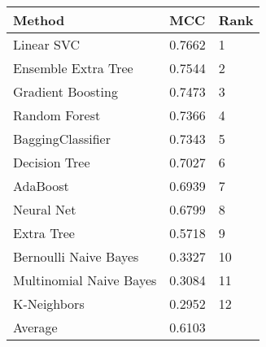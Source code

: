 \begin{tabular}{|l|l|l| }
\hline
Method                  & MCC & Rank \\ \hline
Linear SVC              & 0.7662 & 1\\
Ensemble Extra Tree     & 0.7544 & 2\\
Gradient Boosting       & 0.7473 & 3\\
Random Forest           & 0.7366 & 4\\
BaggingClassifier       & 0.7343 & 5\\
Decision Tree           & 0.7027 & 6\\
AdaBoost                & 0.6939 & 7\\
Neural Net              & 0.6799 & 8\\
Extra Tree              & 0.5718 & 9\\
Bernoulli Naive Bayes   & 0.3327 & 10\\
Multinomial Naive Bayes & 0.3084 & 11\\
K-Neighbors             & 0.2952 & 12\\
Average & 0.6103 & \\
\hline
\end{tabular}